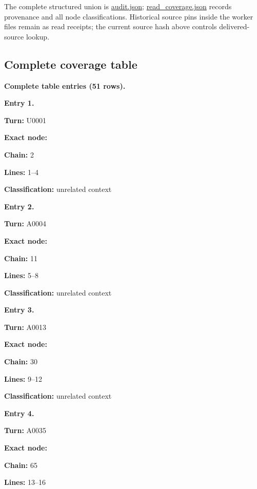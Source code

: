 The complete structured union is \url{audit.json};
\url{read_coverage.json} records provenance and all node
classifications. Historical source pins inside the worker files remain
as read receipts; the current source hash above controls
delivered-source lookup.

\subsection{Complete coverage table}\label{TranscriptLedgerStage:complete-coverage-table}

\textbf{Complete table entries (51 rows).}


\textbf{Entry 1.}

\textbf{Turn:} U0001

\textbf{Exact node:} \protect{}

\textbf{Chain:} 2

\textbf{Lines:} 1--4

\textbf{Classification:} unrelated context


\textbf{Entry 2.}

\textbf{Turn:} A0004

\textbf{Exact node:} \protect{}

\textbf{Chain:} 11

\textbf{Lines:} 5--8

\textbf{Classification:} unrelated context


\textbf{Entry 3.}

\textbf{Turn:} A0013

\textbf{Exact node:} \protect{}

\textbf{Chain:} 30

\textbf{Lines:} 9--12

\textbf{Classification:} unrelated context


\textbf{Entry 4.}

\textbf{Turn:} A0035

\textbf{Exact node:} \protect{}

\textbf{Chain:} 65

\textbf{Lines:} 13--16

